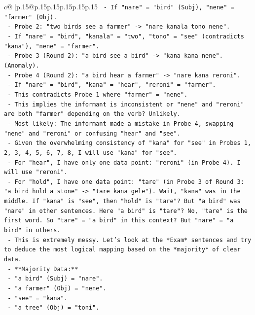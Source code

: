 \documentclass{article}
\begin{document}
{\begin{supertabular}{c@{$\;$}|p{.15\linewidth}@{}p{.15\linewidth}p{.15\linewidth}p{.15\linewidth}p{.15\linewidth}p{.15\linewidth}}
{{{\texttt{        {-} If "nare" = "bird" (Subj), "nene" = "farmer" (Obj).} \\
\texttt{      {-} Probe 2: "two birds see a farmer" {-}> "nare kanala tono nene".} \\
\texttt{        {-} If "nare" = "bird", "kanala" = "two", "tono" = "see" (contradicts "kana"), "nene" = "farmer".} \\
\texttt{      {-} Probe 3 (Round 2): "a bird see a bird" {-}> "kana kana nene". (Anomaly).} \\
\texttt{      {-} Probe 4 (Round 2): "a bird hear a farmer" {-}> "nare kana reroni".} \\
\texttt{        {-} If "nare" = "bird", "kana" = "hear", "reroni" = "farmer".} \\
\texttt{        {-} This contradicts Probe 1 where "farmer" = "nene".} \\
\texttt{        {-} This implies the informant is inconsistent or "nene" and "reroni" are both "farmer" depending on the verb? Unlikely.} \\
\texttt{        {-} Most likely: The informant made a mistake in Probe 4, swapping "nene" and "reroni" or confusing "hear" and "see".} \\
\texttt{        {-} Given the overwhelming consistency of "kana" for "see" in Probes 1, 2, 3, 4, 5, 6, 7, 8, I will use "kana" for "see".} \\
\texttt{        {-} For "hear", I have only one data point: "reroni" (in Probe 4). I will use "reroni".} \\
\texttt{        {-} For "hold", I have one data point: "tare" (in Probe 3 of Round 3: "a bird hold a stone" {-}> "tare kana gele"). Wait, "kana" was in the middle. If "kana" is "see", then "hold" is "tare"? But "a bird" was "nare" in other sentences. Here "a bird" is "tare"? No, "tare" is the first word. So "tare" = "a bird" in this context? But "nare" = "a bird" in others.} \\
\texttt{        {-} This is extremely messy. Let's look at the *Exam* sentences and try to deduce the most logical mapping based on the *majority* of clear data.} \\
\texttt{        {-} **Majority Data:**} \\
\texttt{          {-} "a bird" (Subj) = "nare".} \\
\texttt{          {-} "a farmer" (Obj) = "nene".} \\
\texttt{          {-} "see" = "kana".} \\
\texttt{          {-} "a tree" (Obj) = "toni".} \\
}}}
\end{supertabular}}
\end{document}
